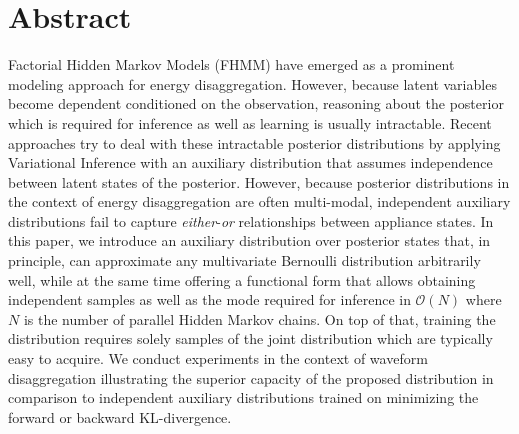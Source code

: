 

\section{Abstract}
Factorial Hidden Markov Models (FHMM) have emerged as a prominent modeling approach for energy disaggregation. However, because latent variables become dependent conditioned on the observation, reasoning about the posterior which is required for inference as well as learning is usually intractable. Recent approaches try to deal with these intractable posterior distributions by applying Variational Inference with an auxiliary distribution that assumes independence between latent states of the posterior. However, because posterior distributions in the context of energy disaggregation are often multi-modal, independent auxiliary distributions fail to capture \emph{either}-\emph{or} relationships between appliance states. In this paper, we introduce an auxiliary distribution over posterior states that, in principle, can approximate any multivariate Bernoulli distribution arbitrarily well, while at the same time offering a functional form that allows obtaining independent samples as well as the mode required for inference in $\mathcal{O}(N)$ where $N$ is the number of parallel Hidden Markov chains. On top of that, training the distribution requires solely samples of the joint distribution which are typically easy to acquire. We conduct experiments in the context of waveform disaggregation illustrating the superior capacity of the proposed distribution in comparison to independent auxiliary distributions trained on minimizing the forward or backward KL-divergence.


